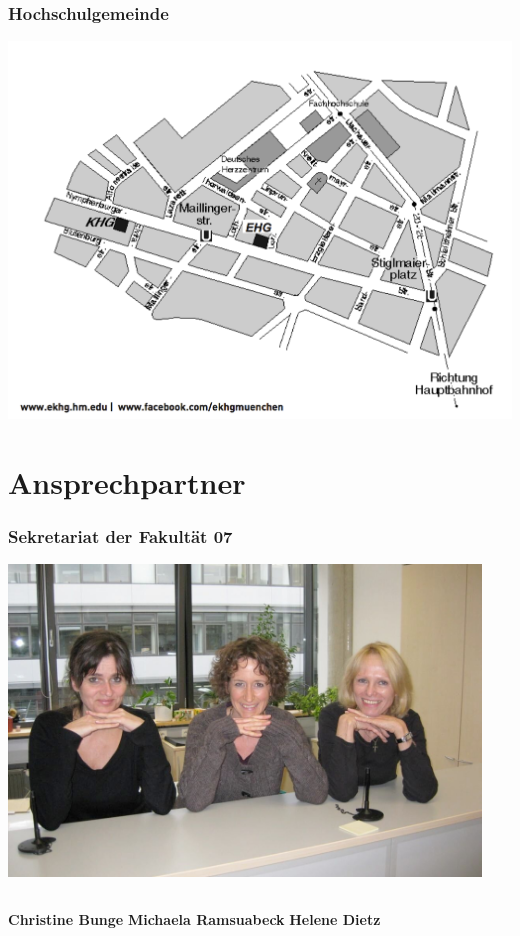 \documentclass{beamer}
\begin{document}
    \begin{frame} 
    	\frametitle{Hochschulgemeinde}
    	\includegraphics[width=1\textwidth]{anfahrt-ekhg.png}
    \end{frame}
    
    \section{Ansprechpartner}
    
    \begin{frame} 
    	\frametitle{Sekretariat der Fakultät 07}
    	\includegraphics[width=0.94\textwidth]{sekretariat.jpg}
    	\begin{columns}[t]
    		\textbf{Christine Bunge}
    		\textbf{Michaela Ramsuabeck}
    		\textbf{Helene Dietz}
    	\end{columns}
    \end{frame}
    
\end{document}
